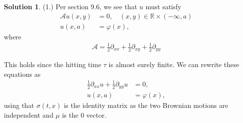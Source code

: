 \documentclass[12pt]{article}
\newcommand{\bbR}{\mathbb{R}}
\renewcommand{\phi}{\varphi}
\theoremstyle{definition}
\newtheorem{sol}{Solution}
\theoremstyle{remark}
\begin{document}
\begin{sol}
    (1.) Per section 9.6, we see that $u$ must satisfy
\begin{align*}
    \mathcal{A} u(x, y) &= 0, \quad  (x, y) \in \bbR \times (-\infty, a) \\
    u(x, a) &= \phi(x),
\end{align*}
where 
\begin{align*}
    \mathcal{A} = \frac{1}{2} \partial_{xx} + \frac{1}{2} \partial_{xy} + \frac{1}{2} \partial_{yy}
\end{align*}

This holds since the hitting time $\tau$ is almost surely finite. We can rewrite these equations as
\begin{align*}
    \frac{1}{2} \partial_{xx}u + \frac{1}{2} \partial_{yy}u &= 0,\\
    u(x, a) &= \phi(x),
\end{align*}
using that $\sigma(t, x)$ is the identity matrix as the two Brownian motions are independent and $\mu$ is the 0 vector.


\end{sol}
\end{document}
